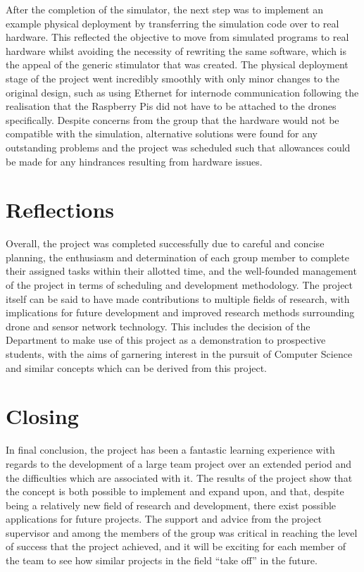 After the completion of the simulator, the next step was to implement an example physical deployment by transferring the simulation code over to real hardware. This reflected the objective to move from simulated programs to real hardware whilst avoiding the necessity of rewriting the same software, which is the appeal of the generic stimulator that was created. The physical deployment stage of the project went incredibly smoothly with only minor changes to the original design, such as using Ethernet for internode communication following the realisation that the Raspberry Pis did not have to be attached to the drones specifically. Despite concerns from the group that the hardware would not be compatible with the simulation, alternative solutions were found for any outstanding problems and the project was scheduled such that allowances could be made for any hindrances resulting from hardware issues.

\section{Reflections}

Overall, the project was completed successfully due to careful and concise planning, the enthusiasm and determination of each group member to complete their assigned tasks within their allotted time, and the well-founded management of the project in terms of scheduling and development methodology. The project itself can be said to have made contributions to multiple fields of research, with implications for future development and improved research methods surrounding drone and sensor network technology. This includes the decision of the Department to make use of this project as a demonstration to prospective students, with the aims of garnering interest in the pursuit of Computer Science and similar concepts which can be derived from this project.

\section{Closing}

In final conclusion, the project has been a fantastic learning experience with regards to the development of a large team project over an extended period and the difficulties which are associated with it. The results of the project show that the concept is both possible to implement and expand upon, and that, despite being a relatively new field of research and development, there exist possible applications for future projects. The support and advice from the project supervisor and among the members of the group was critical in reaching the level of success that the project achieved, and it will be exciting for each member of the team to see how similar projects in the field ``take off'' in the future.